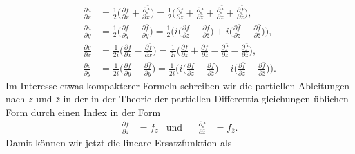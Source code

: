 \begin{align*}
\frac{\partial u}{\partial x}
&=
\frac12
\biggl(
\frac{\partial f}{\partial x}
+
\frac{\partial \bar{f}}{\partial x}
\biggr)
=
\frac12
\biggl(
\frac{\partial f}{\partial z}
+
\frac{\partial f}{\partial \bar{z}}
+
\frac{\partial \bar{f}}{\partial z}
+
\frac{\partial \bar{f}}{\partial \bar{z}}
\biggr),
\\
\frac{\partial u}{\partial y}
&=
\frac12
\biggl(
\frac{\partial f}{\partial y}
+
\frac{\partial \bar{f}}{\partial y}
\biggr)
=
\frac12
\biggl(
i
\biggl(
\frac{\partial f}{\partial z}
-
\frac{\partial f}{\partial\bar{z}}
\biggr)
+
i
\biggl(
\frac{\partial\bar{f}}{\partial z}
-
\frac{\partial\bar{f}}{\partial\bar{z}}
\biggr)
\biggr),
\\
\frac{\partial v}{\partial x}
&=
\frac1{2i}
\biggl(
\frac{\partial f}{\partial x}
-
\frac{\partial\bar{f}}{\partial x}
\biggr)
=
\frac1{2i}
\biggl(
\frac{\partial f}{\partial z}
+
\frac{\partial f}{\partial \bar{z}}
-
\frac{\partial \bar{f}}{\partial z}
-
\frac{\partial \bar{f}}{\partial \bar{z}}
\biggr),
\\
\frac{\partial v}{\partial y}
&=
\frac1{2i}
\biggl(
\frac{\partial f}{\partial y}
-
\frac{\partial\bar{f}}{\partial y}
\biggr)
=
\frac1{2i}
\biggl(
i\biggl(
\frac{\partial f}{\partial z}
-
\frac{\partial f}{\partial\bar{z}}
\biggr)
-i
\biggl(
\frac{\partial\bar{f}}{\partial z}
-
\frac{\partial\bar{f}}{\partial\bar{z}}
\biggr)
\biggr).
\end{align*}
Im Interesse etwas kompakterer Formeln schreiben wir die partiellen
Ableitungen nach $z$ und $\bar{z}$ in der in der Theorie der partiellen
Differentialgleichungen üblichen Form durch einen Index in der Form
\begin{align*}
\frac{\partial f}{\partial z}
&=
f_z
&\text{und}&
&
\frac{\partial f}{\partial \bar{z}}
&=
f_{\bar{z}}.
\end{align*}
Damit können wir jetzt die lineare Ersatzfunktion als
